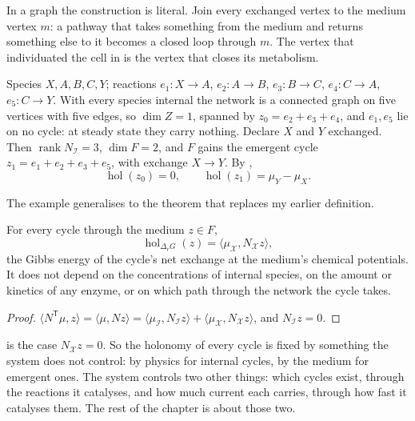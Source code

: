 In a graph the construction is literal. Join every exchanged vertex to the
medium vertex $m$: a pathway that takes something from the medium and
returns something else to it becomes a closed loop through $m$. The vertex
that individuated the cell in  is the vertex that
closes its metabolism.

\begin{example}
\label{c1:ex-toy}
Species $X,A,B,C,Y$; reactions $e_1\colon X\to A$, $e_2\colon A\to B$,
$e_3\colon B\to C$, $e_4\colon C\to A$, $e_5\colon C\to Y$. With every
species internal the network is a connected graph on five vertices with five
edges, so $\dim Z=1$, spanned by $z_0=e_2+e_3+e_4$, and $e_1,e_5$ lie on no
cycle: at steady state they carry nothing. Declare $X$ and $Y$ exchanged.
Then $\operatorname{rank}N_{\mathcal I}=3$, $\dim F=2$, and $F$ gains the
emergent cycle $z_1=e_1+e_2+e_3+e_5$, with exchange $X\to Y$. By
,
\[
\operatorname{hol}(z_0)=0,\qquad
\operatorname{hol}(z_1)=\mu_Y-\mu_X .
\]
\end{example}

The example generalises to the theorem that replaces my earlier definition.

\begin{theorem}
\label{c1:thm-medium}
\lnkD{} For every cycle through the medium $z\in F$,
\begin{equation}
\operatorname{hol}_{\Delta_rG}(z)
=\langle\mu_{\mathcal X},N_{\mathcal X}z\rangle ,
\label{c1:eq-medium}
\end{equation}
the Gibbs energy of the cycle's net exchange at the medium's chemical
potentials. It does not depend on the concentrations of internal species,
on the amount or kinetics of any enzyme, or on which path through the
network the cycle takes.
\end{theorem}

\begin{proof}
$\langle N^{\mathsf T}\mu,z\rangle=\langle\mu,Nz\rangle
=\langle\mu_{\mathcal I},N_{\mathcal I}z\rangle+
\langle\mu_{\mathcal X},N_{\mathcal X}z\rangle$, and $N_{\mathcal I}z=0$.
\end{proof}

 is the case $N_{\mathcal X}z=0$. So the holonomy of
every cycle is fixed by something the system does not control: by physics
for internal cycles, by the medium for emergent ones. The system controls
two other things: which cycles exist, through the reactions it catalyses,
and how much current each carries, through how fast it catalyses them. The
rest of the chapter is about those two.

